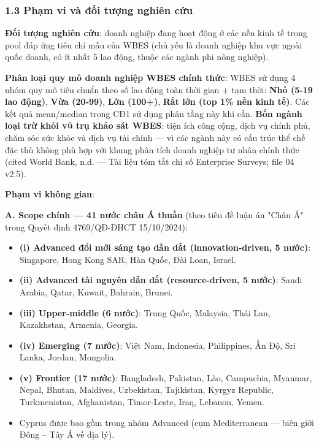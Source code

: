 \documentclass[12pt,a4paper]{article}
\providecommand{\tightlist}{\setlength{\itemsep}{0pt}\setlength{\parskip}{0pt}}
\begin{document}
\hypertarget{13-phux1ea1m-vi-vuxe0-ux111ux1ed1i-tux1b0ux1ee3ng-nghiuxean-cux1ee9u}{%
\subsubsection{1.3 Phạm vi và đối tượng nghiên
cứu}\label{13-phux1ea1m-vi-vuxe0-ux111ux1ed1i-tux1b0ux1ee3ng-nghiuxean-cux1ee9u}}

\textbf{Đối tượng nghiên cứu}: doanh nghiệp đang hoạt động ở các nền
kinh tế trong pool đáp ứng tiêu chí mẫu của WBES (chủ yếu là doanh
nghiệp khu vực ngoài quốc doanh, có ít nhất 5 lao động, thuộc các ngành
phi nông nghiệp).

\textbf{Phân loại quy mô doanh nghiệp WBES chính thức}: WBES sử dụng 4
nhóm quy mô tiêu chuẩn theo số lao động toàn thời gian + tạm thời:
\textbf{Nhỏ (5-19 lao động)}, \textbf{Vừa (20-99)}, \textbf{Lớn (100+)},
\textbf{Rất lớn (top 1\% nền kinh tế)}. Các kết quả mean/median trong
CĐ1 sử dụng phân tầng này khi cần. \textbf{Bốn ngành loại trừ khỏi vũ
trụ khảo sát WBES}: tiện ích công cộng, dịch vụ chính phủ, chăm sóc sức
khỏe và dịch vụ tài chính --- vì các ngành này có cấu trúc thể chế đặc
thù không phù hợp với khung phân tích doanh nghiệp tư nhân chính thức
(cited World Bank, n.d. --- Tài liệu tóm tắt chỉ số Enterprise Surveys;
file 04 v2.5).

\textbf{Phạm vi không gian}:

\textbf{A. Scope chính --- 41 nước châu Á thuần} (theo tiêu đề luận án
"Châu Á" trong Quyết định 4769/QĐ-ĐHCT 15/10/2024):

\begin{itemize}
\tightlist
\item
  \textbf{(i) Advanced đổi mới sáng tạo dẫn dắt (innovation-driven, 5
  nước)}: Singapore, Hong Kong SAR, Hàn Quốc, Đài Loan, Israel.
\item
  \textbf{(ii) Advanced tài nguyên dẫn dắt (resource-driven, 5 nước)}:
  Saudi Arabia, Qatar, Kuwait, Bahrain, Brunei.
\item
  \textbf{(iii) Upper-middle (6 nước)}: Trung Quốc, Malaysia, Thái Lan,
  Kazakhstan, Armenia, Georgia.
\item
  \textbf{(iv) Emerging (7 nước)}: Việt Nam, Indonesia, Philippines, Ấn
  Độ, Sri Lanka, Jordan, Mongolia.
\item
  \textbf{(v) Frontier (17 nước)}: Bangladesh, Pakistan, Lào, Campuchia,
  Myanmar, Nepal, Bhutan, Maldives, Uzbekistan, Tajikistan, Kyrgyz
  Republic, Turkmenistan, Afghanistan, Timor-Leste, Iraq, Lebanon,
  Yemen.
\item
  Cyprus được bao gồm trong nhóm Advanced (cụm Mediterranean --- biên
  giới Đông -- Tây Á về địa lý).
\end{itemize}
\end{document}
